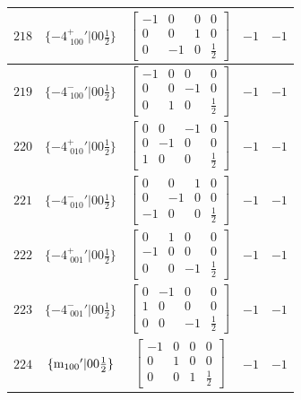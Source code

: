 \documentclass[fleqn,8pt]{jsarticle}
\begin{document}
\begin{longtable}{ccccc}
$ 218 $ & $ \{-4^{+}_{\,\,100}{}'|0 0 \frac{1}{2}\} $ & $ \begin{bmatrix} -1 & 0 & 0 & 0 \\ 0 & 0 & 1 & 0 \\ 0 & -1 & 0 & \frac{1}{2} \end{bmatrix} $ & $ -1 $ & $ -1 $ \\ \hline
$ 219 $ & $ \{-4^{-}_{\,\,100}{}'|0 0 \frac{1}{2}\} $ & $ \begin{bmatrix} -1 & 0 & 0 & 0 \\ 0 & 0 & -1 & 0 \\ 0 & 1 & 0 & \frac{1}{2} \end{bmatrix} $ & $ -1 $ & $ -1 $ \\ \hline
$ 220 $ & $ \{-4^{+}_{\,\,010}{}'|0 0 \frac{1}{2}\} $ & $ \begin{bmatrix} 0 & 0 & -1 & 0 \\ 0 & -1 & 0 & 0 \\ 1 & 0 & 0 & \frac{1}{2} \end{bmatrix} $ & $ -1 $ & $ -1 $ \\ \hline
$ 221 $ & $ \{-4^{-}_{\,\,010}{}'|0 0 \frac{1}{2}\} $ & $ \begin{bmatrix} 0 & 0 & 1 & 0 \\ 0 & -1 & 0 & 0 \\ -1 & 0 & 0 & \frac{1}{2} \end{bmatrix} $ & $ -1 $ & $ -1 $ \\ \hline
$ 222 $ & $ \{-4^{+}_{\,\,001}{}'|0 0 \frac{1}{2}\} $ & $ \begin{bmatrix} 0 & 1 & 0 & 0 \\ -1 & 0 & 0 & 0 \\ 0 & 0 & -1 & \frac{1}{2} \end{bmatrix} $ & $ -1 $ & $ -1 $ \\ \hline
$ 223 $ & $ \{-4^{-}_{\,\,001}{}'|0 0 \frac{1}{2}\} $ & $ \begin{bmatrix} 0 & -1 & 0 & 0 \\ 1 & 0 & 0 & 0 \\ 0 & 0 & -1 & \frac{1}{2} \end{bmatrix} $ & $ -1 $ & $ -1 $ \\ \hline
$ 224 $ & $ \{{\rm m}_{100}{}'|0 0 \frac{1}{2}\} $ & $ \begin{bmatrix} -1 & 0 & 0 & 0 \\ 0 & 1 & 0 & 0 \\ 0 & 0 & 1 & \frac{1}{2} \end{bmatrix} $ & $ -1 $ & $ -1 $ \\ \hline

\end{longtable}
\end{document}
